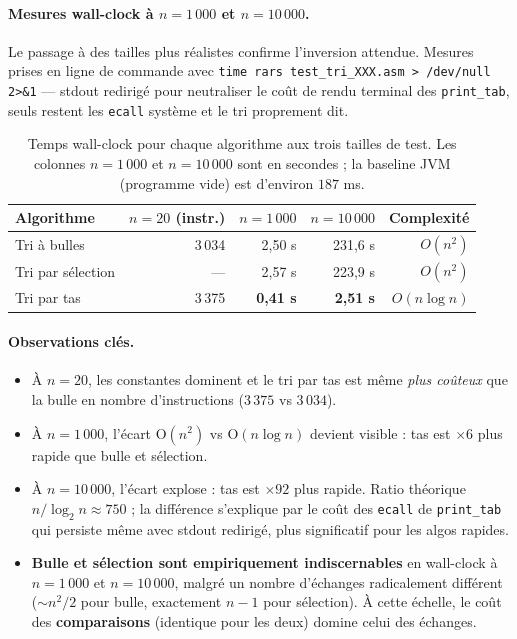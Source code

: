 \documentclass[11pt,a4paper]{article}
\begin{document}
\paragraph{Mesures wall-clock à $n = 1\,000$ et $n = 10\,000$.}

Le passage à des tailles plus réalistes confirme l'inversion attendue.
Mesures prises en ligne de commande avec \texttt{time rars
test\_tri\_XXX.asm > /dev/null 2>\&1} --- stdout redirigé pour neutraliser
le coût de rendu terminal des \texttt{print\_tab}, seuls restent les
\texttt{ecall} système et le tri proprement dit.

\begin{table}[h]
\centering
\begin{tabular}{lrrrr}
\toprule
\textbf{Algorithme} & \textbf{$n=20$ (instr.)} & \textbf{$n=1\,000$} & \textbf{$n=10\,000$} & \textbf{Complexité} \\
\midrule
Tri à bulles      & 3\,034 & 2,50 s & 231,6 s & $O(n^2)$ \\
Tri par sélection & ---    & 2,57 s & 223,9 s & $O(n^2)$ \\
Tri par tas       & 3\,375 & \textbf{0,41 s} & \textbf{2,51 s} & $O(n \log n)$ \\
\bottomrule
\end{tabular}
\caption{Temps wall-clock pour chaque algorithme aux trois tailles
de test. Les colonnes $n=1\,000$ et $n=10\,000$ sont en secondes ;
la baseline JVM (programme vide) est d'environ $187$ ms.}
\end{table}

\paragraph{Observations clés.}

\begin{itemize}
    \item À \textbf{$n=20$}, les constantes dominent et le tri par tas
          est même \emph{plus coûteux} que la bulle en nombre
          d'instructions ($3\,375$ vs $3\,034$).
    \item À \textbf{$n=1\,000$}, l'écart O$(n^2)$ vs O$(n \log n)$ devient
          visible : tas est $\times 6$ plus rapide que bulle et sélection.
    \item À \textbf{$n=10\,000$}, l'écart explose : tas est $\times 92$
          plus rapide. Ratio théorique $n / \log_2 n \approx 750$ ;
          la différence s'explique par le coût des \texttt{ecall} de
          \texttt{print\_tab} qui persiste même avec stdout redirigé,
          plus significatif pour les algos rapides.
    \item \textbf{Bulle et sélection sont empiriquement indiscernables}
          en wall-clock à $n=1\,000$ et $n=10\,000$, malgré un nombre
          d'échanges radicalement différent ($\sim n^2/2$ pour bulle,
          exactement $n-1$ pour sélection). À cette échelle, le coût
          des \textbf{comparaisons} (identique pour les deux) domine
          celui des échanges.
\end{itemize}
\end{document}
